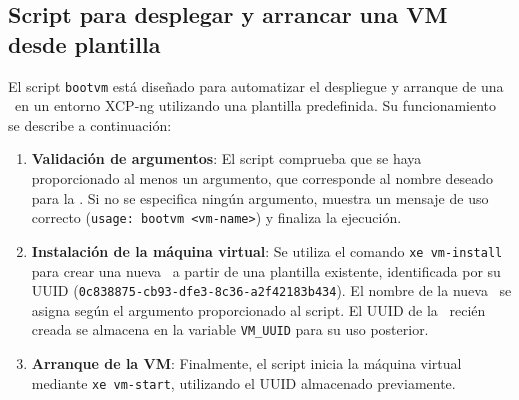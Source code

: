 

\subsection{Script para desplegar y arrancar una VM desde plantilla}

El script \texttt{bootvm} está diseñado para automatizar el despliegue y arranque de una \VM\ en un entorno XCP-ng utilizando una plantilla predefinida. Su funcionamiento se describe a continuación:

\begin{enumerate}
    \item \textbf{Validación de argumentos}:  
    El script comprueba que se haya proporcionado al menos un argumento, que corresponde al nombre deseado para la \VM. Si no se especifica ningún argumento, muestra un mensaje de uso correcto (\texttt{usage: bootvm <vm-name>}) y finaliza la ejecución.

    \item \textbf{Instalación de la máquina virtual}:  
    Se utiliza el comando \texttt{xe vm-install} para crear una nueva \VM\ a partir de una plantilla existente, identificada por su UUID (\texttt{0c838875-cb93-dfe3-8c36-a2f42183b434}). El nombre de la nueva \VM\ se asigna según el argumento proporcionado al script. El UUID de la \VM\ recién creada se almacena en la variable \texttt{VM\_UUID} para su uso posterior.

    \item \textbf{Arranque de la VM}:  
    Finalmente, el script inicia la máquina virtual mediante \texttt{xe vm-start}, utilizando el UUID almacenado previamente.

\end{enumerate}


